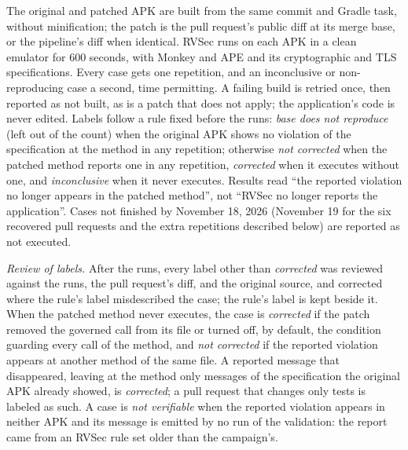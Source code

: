 \documentclass[conference]{IEEEtran}
\begin{document}
The original and patched APK are built from the same commit and Gradle task,
without minification; the patch is the pull request's public diff at its
merge base, or the pipeline's diff when identical. RVSec runs on each APK in a
clean emulator for 600 seconds, with Monkey and APE and its cryptographic and
TLS specifications. Every case gets one repetition, and an inconclusive or
non-reproducing case a second, time permitting. A failing build is retried
once, then reported as not built, as is a patch that does not apply; the
application's code is never edited. Labels follow a rule fixed before the
runs: \emph{base does not reproduce} (left out of the count) when the original
APK shows no violation of the specification at the method in any repetition;
otherwise \emph{not corrected} when the patched method reports one in any
repetition, \emph{corrected} when it executes without one, and
\emph{inconclusive} when it never executes. Results read ``the reported
violation no longer appears in the patched method'', not ``RVSec no longer
reports the application''. Cases not finished by November 18, 2026
(November 19 for the six recovered pull requests and the extra repetitions
described below) are reported as not
executed.

\emph{Review of labels.} After the runs, every label other than \emph{corrected}
was reviewed against the runs, the pull request's diff, and the original
source, and corrected where the rule's label misdescribed the case; the rule's
label is kept beside it. When the patched method never executes, the case is
\emph{corrected} if the patch removed the governed call from its file or turned
off, by default, the condition guarding every call of the method, and \emph{not
corrected} if the reported violation appears at another method of the same
file. A reported message that disappeared, leaving at the method only messages
of the specification the original APK already showed, is \emph{corrected}; a
pull request that changes only tests is labeled as such. A case is \emph{not
verifiable} when the reported violation appears in neither APK and its message
is emitted by no run of the validation: the report came from an RVSec rule set
older than the campaign's.
\end{document}
